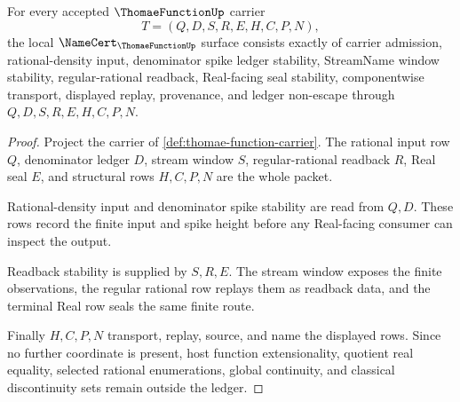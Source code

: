 \begin{theorem}
\label{thm:thomae-function-namecert-obligations}
For every accepted $\ThomaeFunctionUp$ carrier
$$
T=(Q,D,S,R,E,H,C,P,N),
$$
the local $\NameCert_{\ThomaeFunctionUp}$ surface consists exactly of carrier admission, rational-density input, denominator spike ledger stability, StreamName window stability, regular-rational readback, Real-facing seal stability, componentwise transport, displayed replay, provenance, and ledger non-escape through $Q,D,S,R,E,H,C,P,N$.
\end{theorem}
\begin{proof}
Project the carrier of \autoref{def:thomae-function-carrier}. The rational input row $Q$, denominator ledger $D$, stream window $S$, regular-rational readback $R$, Real seal $E$, and structural rows $H,C,P,N$ are the whole packet.

Rational-density input and denominator spike stability are read from $Q,D$. These rows record the finite input and spike height before any Real-facing consumer can inspect the output.

Readback stability is supplied by $S,R,E$. The stream window exposes the finite observations, the regular rational row replays them as readback data, and the terminal Real row seals the same finite route.

Finally $H,C,P,N$ transport, replay, source, and name the displayed rows. Since no further coordinate is present, host function extensionality, quotient real equality, selected rational enumerations, global continuity, and classical discontinuity sets remain outside the ledger.
\end{proof}

